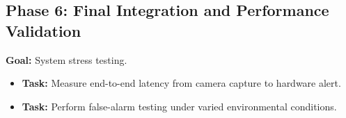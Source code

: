 \documentclass[12pt,a4paper]{article}
\begin{document}
\subsection{Phase 6: Final Integration and Performance Validation}
\textbf{Goal:} System stress testing.
\begin{itemize}
    \item \textbf{Task:} Measure end-to-end latency from camera capture to hardware alert.
    \item \textbf{Task:} Perform false-alarm testing under varied environmental conditions.
\end{itemize}
\end{document}
